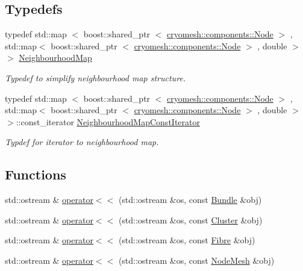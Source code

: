 \subsection*{\-Typedefs}
\begin{DoxyCompactItemize}
\item 
typedef std\-::map\*
$<$ boost\-::shared\-\_\-ptr\*
$<$ \hyperlink{classcryomesh_1_1components_1_1Node}{cryomesh\-::components\-::\-Node} $>$\*
, std\-::map$<$ boost\-::shared\-\_\-ptr\*
$<$ \hyperlink{classcryomesh_1_1components_1_1Node}{cryomesh\-::components\-::\-Node} $>$\*
, double $>$ $>$ \hyperlink{namespacecryomesh_1_1structures_a50c955c70377b1dc7d3fcf1364d5e33e}{\-Neighbourhood\-Map}
\begin{DoxyCompactList}\small\item\em \-Typedef to simplify neighbourhood map structure. \end{DoxyCompactList}\item 
typedef std\-::map\*
$<$ boost\-::shared\-\_\-ptr\*
$<$ \hyperlink{classcryomesh_1_1components_1_1Node}{cryomesh\-::components\-::\-Node} $>$\*
, std\-::map$<$ boost\-::shared\-\_\-ptr\*
$<$ \hyperlink{classcryomesh_1_1components_1_1Node}{cryomesh\-::components\-::\-Node} $>$\*
, double $>$ $>$\-::const\-\_\-iterator \hyperlink{namespacecryomesh_1_1structures_a321983538b31d02a5bb7345c72c63769}{\-Neighbourhood\-Map\-Const\-Iterator}
\begin{DoxyCompactList}\small\item\em \-Typdef for iterator to neighbourhood map. \end{DoxyCompactList}\end{DoxyCompactItemize}
\subsection*{\-Functions}
\begin{DoxyCompactItemize}
\item 
std\-::ostream \& \hyperlink{namespacecryomesh_1_1structures_a2e1e77e062248b853cfcfc84d5451ca7}{operator$<$$<$} (std\-::ostream \&os, const \hyperlink{classcryomesh_1_1structures_1_1Bundle}{\-Bundle} \&obj)
\item 
std\-::ostream \& \hyperlink{namespacecryomesh_1_1structures_abcd04bbc637a047b78e8fe786d5849a0}{operator$<$$<$} (std\-::ostream \&os, const \hyperlink{classcryomesh_1_1structures_1_1Cluster}{\-Cluster} \&obj)
\item 
std\-::ostream \& \hyperlink{namespacecryomesh_1_1structures_a5193b0012f22b1fd0663b95152c0347e}{operator$<$$<$} (std\-::ostream \&os, const \hyperlink{classcryomesh_1_1structures_1_1Fibre}{\-Fibre} \&obj)
\item 
std\-::ostream \& \hyperlink{namespacecryomesh_1_1structures_ababe2609b3503ef7d3abf4e2b576ce88}{operator$<$$<$} (std\-::ostream \&os, const \hyperlink{classcryomesh_1_1structures_1_1NodeMesh}{\-Node\-Mesh} \&obj)
\end{DoxyCompactItemize}


